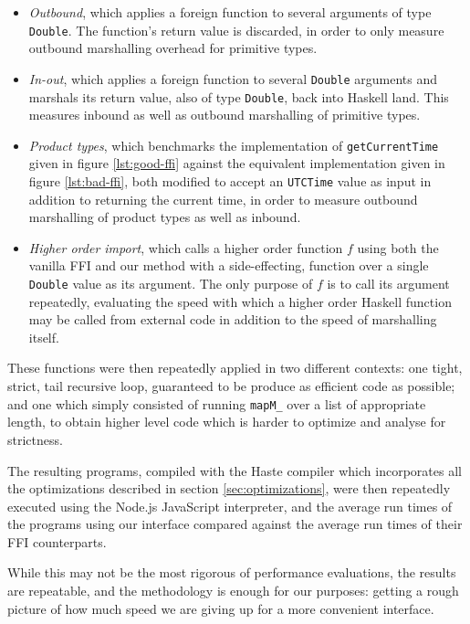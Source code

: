 \documentclass[preprint]{sigplanconf}
\begin{document}
\begin{itemize}
\item
  \emph{Outbound}, which applies a foreign function to several arguments of
  type \lstinline!Double!. The function's return value is discarded, in order
  to only measure outbound marshalling overhead for primitive types.
\item
  \emph{In-out}, which applies a foreign function to several \lstinline!Double!
  arguments and marshals its return value, also of type \lstinline!Double!,
  back into Haskell land. This measures inbound as well as outbound marshalling
  of primitive types.
\item
  \emph{Product types}, which benchmarks the implementation of\linebreak
  \lstinline!getCurrentTime! given in figure \ref{lst:good-ffi} against
  the equivalent implementation given in figure \ref{lst:bad-ffi}, both
  modified to accept an \lstinline!UTCTime! value as input in addition to
  returning the current time, in order to measure outbound marshalling of
  product types as well as inbound.
\item
  \emph{Higher order import}, which calls a higher order function $f$ using
  both the vanilla FFI and our method with a side-effecting, function over a
  single \lstinline!Double! value as its argument.
  The only purpose of $f$ is to call its argument repeatedly,
  evaluating the speed with which a higher order Haskell function may be called
  from external code in addition to the speed of marshalling itself.
\end{itemize}

These functions were then repeatedly applied in two different contexts: one
tight, strict, tail recursive loop, guaranteed to be produce as efficient code
as possible; and one which simply consisted of running \lstinline!mapM_! over
a list of appropriate length, to obtain higher level code which is harder to
optimize and analyse for strictness.

The resulting programs, compiled with the Haste compiler which incorporates all
the optimizations described in section \ref{sec:optimizations},
were then repeatedly executed using the Node.js JavaScript interpreter,
and the average run times of the programs using our interface compared against
the average run times of their FFI counterparts.

While this may not be the most rigorous of performance evaluations,
the results are repeatable, and the methodology is enough for our purposes:
getting a rough picture of how much speed we are giving up for a more
convenient interface.
\end{document}
